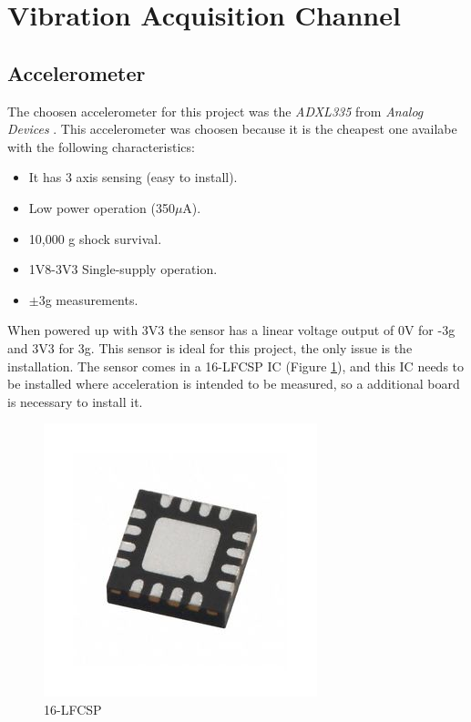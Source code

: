 \section{Vibration Acquisition Channel}\label{sec:vibration-acquisition-channel}

\subsection{Accelerometer}\label{ssec:accelerometer-signal}
	The choosen accelerometer for this project was the \textit{ADXL335} from \textit{Analog Devices} \cite{devices2010adxl335}. This accelerometer was choosen because it is the cheapest one availabe with the following characteristics:

	\begin{itemize}
		\item It has 3 axis sensing (easy to install).
		\item Low power operation (350$\mu$A).
		\item 10,000 g shock survival.
		\item 1V8-3V3 Single-supply operation.
		\item $\pm$3g measurements.
	\end{itemize}

	When powered up with 3V3 the sensor has a linear voltage output of 0V for -3g and 3V3 for 3g. This sensor is ideal for this project, the only issue is the installation. The sensor comes in a 16-LFCSP IC (Figure \ref{fig:16lfcsp}), and this IC needs to be installed where acceleration is intended to be measured, so a additional board is necessary to install it. 

	\begin{figure}[htbp]
		\centering
			\includegraphics[scale=2]{figuras/fig-16lfcsp.jpg}
		\caption{16-LFCSP \cite{16lfcsp}}
		\label{fig:16lfcsp}
	\end{figure}

